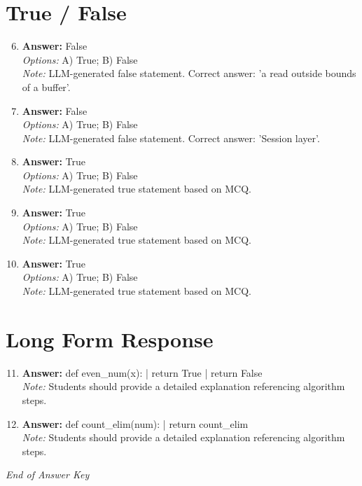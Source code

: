 \documentclass[12pt]{article}
\begin{document}
\section*{True / False}
\begin{enumerate}[label=\arabic*.]
\setcounter{enumi}{5}
\item \textbf{Answer:} False
\\ \textit{Options:} A) True; B) False
\\ \textit{Note:} LLM-generated false statement. Correct answer: 'a read outside bounds of a buffer'.
\item \textbf{Answer:} False
\\ \textit{Options:} A) True; B) False
\\ \textit{Note:} LLM-generated false statement. Correct answer: 'Session layer'.
\item \textbf{Answer:} True
\\ \textit{Options:} A) True; B) False
\\ \textit{Note:} LLM-generated true statement based on MCQ.
\item \textbf{Answer:} True
\\ \textit{Options:} A) True; B) False
\\ \textit{Note:} LLM-generated true statement based on MCQ.
\item \textbf{Answer:} True
\\ \textit{Options:} A) True; B) False
\\ \textit{Note:} LLM-generated true statement based on MCQ.
\end{enumerate}

\section*{Long Form Response}
\begin{enumerate}[label=\arabic*.]
\setcounter{enumi}{10}
\item \textbf{Answer:} def even\_num(x): | return True | return False
\\ \textit{Note:} Students should provide a detailed explanation referencing algorithm steps.
\item \textbf{Answer:} def count\_elim(num): | return count\_elim
\\ \textit{Note:} Students should provide a detailed explanation referencing algorithm steps.
\end{enumerate}

\vfill
\noindent\textit{End of Answer Key}
\end{document}
